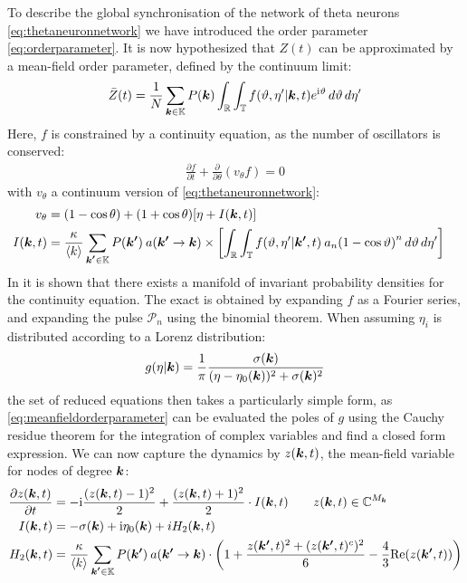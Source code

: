 To describe the global synchronisation of the network of theta neurons \eqref{eq:thetaneuronnetwork} we have introduced the order parameter \eqref{eq:orderparameter}. It is now hypothesized that $Z(t)$ can be approximated by a mean-field order parameter, defined by the continuum limit:
\begin{align}
\bar{Z}(t)= \frac{1}{N} \sum_{\k \in \K}P(\k) \int_{\R} \int_{\T} f\left(\vartheta, \eta^{\prime} | \k, t\right) e^{\ic \vartheta} \mathop{d \vartheta} \mathop{d \eta^{\prime}} \label{eq:meanfieldorderparameter}
\end{align}
Here, $f$ is constrained by a continuity equation, as the number of oscillators is conserved:
\begin{align}
\frac{\partial f}{\partial t}+\frac{\partial}{\partial \theta}\left(v_{\theta} f\right) = 0 \label{eq:transportequation}
\end{align}
with $v_{\theta}$ a continuum version of \eqref{eq:thetaneuronnetwork}:
\begin{align*}
v_{\theta} &= (1-\cos \theta)+(1+\cos \theta) \left[\eta + I(\k,t) \right]\\
I(\k,t) &= \frac{\kappa}{\kmean}\sum_{\kacc \in \K} P(\kacc ) \:a\left(\kacc \rightarrow \k \right) \times \left[ \int_{\R} \int_{\T} f\left(\vartheta, \eta^{\prime} | \kacc, t\right) \: a_{n} \left(1-\cos \vartheta\right)^{n} \mathop{d \vartheta} \mathop{d \eta^{\prime}} \right] &
\end{align*}
In \cite{OttAntonsen2008} it is shown that there exists a manifold of invariant probability densities for the continuity equation. The exact \MFR is obtained by expanding $f$ as a Fourier series, and expanding the pulse $\mathcal{P}_n$ using the binomial theorem. When assuming $\eta_i$ is distributed according to a Lorenz distribution:
\begin{align}
g(\eta |{\boldsymbol{k}})=\frac{1}{\pi} \frac{\sigma({\boldsymbol{k}})}{(\eta-\eta_{0}({\boldsymbol{k}}))^{2}+\sigma({\boldsymbol{k}})^{2}} \label{eq:Lorentzpdf}
\end{align}
the set of reduced equations then takes a particularly simple form, as \eqref{eq:meanfieldorderparameter} can be evaluated the poles of $g$ using the Cauchy residue theorem for the integration of complex variables and find a closed form expression. We can now capture the dynamics by $z({\boldsymbol{k}},t)$, the mean-field variable for nodes of degree ${\boldsymbol{k}}$:
\begin{align}
\frac{\partial z(\k, t)}{\partial t} &= -\ic \frac{(z(\k, t)-1)^{2}}{2} + \frac{(z(\k, t)+1)^{2}}{2} \cdot I(\k, t) \qquad z(\k,t) \in \C^{M_\k} \nonumber \\
I(\k, t) &= -\sigma(\k) + \ic \eta_{0}(\k) + i H_2(\k,t) \label{eq:OttAntonsenSystemFull} \\
H_2(\k,t) &= \frac{\kappa}{\kmean} \sum_{\kacc \in \K} P\left(\kacc\right) \: a\left(\kacc \rightarrow \k\right) \cdot \left( 1 + \frac{z(\kacc, t)^2 + (z(\kacc, t)^c )^2}{6} - \frac{4}{3} \Re(z(\kacc, t)) \right) \nonumber
\end{align}
